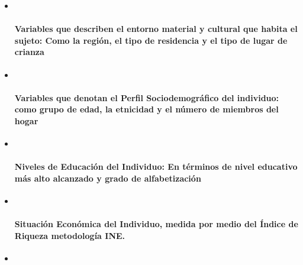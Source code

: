 \documentclass[]{article}
\let\oldparagraph\paragraph
\renewcommand{\paragraph}[1]{\oldparagraph{#1}\mbox{}}
\begin{document}
\begin{itemize}
\item ~
  \paragraph{\texorpdfstring{Variables que describen el entorno material
  y cultural que habita el sujeto: Como la \textbf{región}, el
  \textbf{tipo de residencia} y el \textbf{tipo de lugar de
  crianza}}{Variables que describen el entorno material y cultural que habita el sujeto: Como la región, el tipo de residencia y el tipo de lugar de crianza}}\label{variables-que-describen-el-entorno-material-y-cultural-que-habita-el-sujeto-como-la-region-el-tipo-de-residencia-y-el-tipo-de-lugar-de-crianza}
\item ~
  \paragraph{\texorpdfstring{Variables que denotan el Perfil
  Sociodemográfico del individuo: como \textbf{grupo de edad}, la
  \textbf{etnicidad} y el \textbf{número de miembros del
  hogar}}{Variables que denotan el Perfil Sociodemográfico del individuo: como grupo de edad, la etnicidad y el número de miembros del hogar}}\label{variables-que-denotan-el-perfil-sociodemografico-del-individuo-como-grupo-de-edad-la-etnicidad-y-el-numero-de-miembros-del-hogar}
\item ~
  \paragraph{\texorpdfstring{Niveles de Educación del Individuo: En
  términos de \textbf{nivel educativo más alto alcanzado} y
  \textbf{grado de
  alfabetización}}{Niveles de Educación del Individuo: En términos de nivel educativo más alto alcanzado y grado de alfabetización}}\label{niveles-de-educacion-del-individuo-en-terminos-de-nivel-educativo-mas-alto-alcanzado-y-grado-de-alfabetizacion}
\item ~
  \paragraph{\texorpdfstring{Situación Económica del Individuo, medida
  por medio del \textbf{Índice de Riqueza} metodología
  INE.}{Situación Económica del Individuo, medida por medio del Índice de Riqueza metodología INE.}}\label{situacion-economica-del-individuo-medida-por-medio-del-indice-de-riqueza-metodologia-ine.}
\item ~

\end{itemize}
\end{document}
